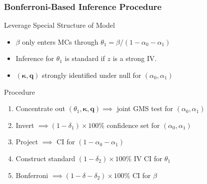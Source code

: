 \documentclass{beamer}
\begin{document}
%
%
\begin{frame}
  \frametitle{Bonferroni-Based Inference Procedure}
  

  \begin{block}{Leverage Special Structure of Model}
    \begin{itemize}
      \item $\beta$ only enters MCs through $\theta_1 = \beta/ (1 - \alpha_0 - \alpha_1)$
      \item Inference for $\theta_1$ is standard if $z$ is a strong IV. 
      \item $(\boldsymbol{\kappa}, \mathbf{q})$ strongly identified under null for $(\alpha_0, \alpha_1)$
    \end{itemize}

    \begin{block}{Procedure}
      \begin{enumerate}
        \item Concentrate out $(\theta_1, \boldsymbol{\kappa}, \boldsymbol{q}) \implies$ joint GMS test for $(\alpha_0, \alpha_1)$ 
        \item Invert $\implies (1 - \delta_1)\times 100\%$ confidence set for $(\alpha_0, \alpha_1)$
        \item Project $\implies$ CI for $(1 - \alpha_0 - \alpha_1)$
        \item Construct standard $(1 - \delta_2)\times 100\%$ IV CI for $\theta_1$
        \item Bonferroni $\implies (1 - \delta - \delta_2)\times 100\%$ CI for $\beta$
      \end{enumerate}
    \end{block}
    
  \end{block}
  
\end{frame}
\end{document}

